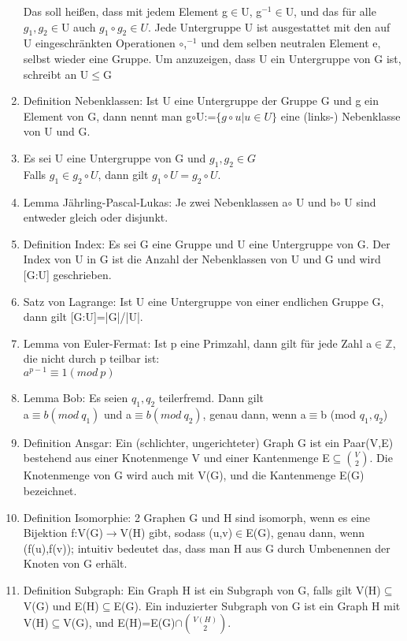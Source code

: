 \documentclass{scrartcl}
\begin{document}
\begin{enumerate}
    Das soll heißen, dass mit jedem Element g$\in$U, g$^{-1}\in$U, und das für alle $g_1,g_2\in$U auch $g_1\circ g_2\in U$. Jede Untergruppe U ist ausgestattet mit den auf U eingeschränkten Operationen $\circ$,$^{-1}$ und dem selben neutralen Element e, selbst wieder eine Gruppe. Um anzuzeigen, dass U ein Untergruppe von G ist, schreibt an U$\leq$G
    \item Definition Nebenklassen: Ist U eine Untergruppe der Gruppe G und g ein Element von G, dann nennt man g$\circ$U:=$\{g\circ u|u\in U\}$ eine (links-) Nebenklasse von U und G.
	\item Es sei U eine Untergruppe von G und $g_1,g_2\in G$\\
	Falls $g_1\in g_2\circ U$, dann gilt $g_1\circ U=g_2\circ U.$
	\item Lemma Jährling-Pascal-Lukas: Je zwei Nebenklassen a$\circ$ U und b$\circ$ U sind entweder gleich oder disjunkt.
	\item Definition Index: Es sei G eine Gruppe und U eine Untergruppe von G. Der Index von U in G ist die Anzahl der Nebenklassen von U und G und wird [G:U] geschrieben.
	\item Satz von Lagrange: Ist U eine Untergruppe von einer endlichen Gruppe G, dann gilt [G:U]=|G|/|U|.
	\item Lemma von Euler-Fermat: Ist p eine Primzahl, dann gilt für jede Zahl a$\in\mathbb{Z}$, die nicht durch p teilbar ist:\\
	$a^{p-1}\equiv 1(mod~ p)$
	\item Lemma Bob: Es seien $q_1,q_2$ teilerfremd. Dann gilt\\
	a$\equiv b(mod~q_1)$ und a$\equiv b(mod~q_2)$, genau dann, wenn a$\equiv$b (mod $q_1,q_2$)
	\item Definition Ansgar: Ein (schlichter, ungerichteter) Graph G ist ein Paar(V,E) bestehend aus einer Knotenmenge V und einer Kantenmenge E$\subseteq\binom{V}{2}$. Die Knotenmenge von G wird auch mit V(G), und die Kantenmenge E(G) bezeichnet.
	\item Definition Isomorphie: 2 Graphen G und H sind isomorph, wenn es eine Bijektion f:V(G)$\rightarrow$V(H) gibt, sodass (u,v)$\in$E(G), genau dann, wenn (f(u),f(v)); intuitiv bedeutet das, dass man H aus G durch Umbenennen der Knoten von G erhält.
	\item Definition Subgraph: Ein Graph H ist ein Subgraph von G, falls gilt V(H)$\subseteq$V(G) und E(H)$\subseteq$E(G). Ein induzierter Subgraph von G ist ein Graph H mit V(H)$\subseteq$V(G), und E(H)=E(G)$\cap\binom{V(H)}{2}$.
    
    
\end{enumerate}
	
\end{document}
